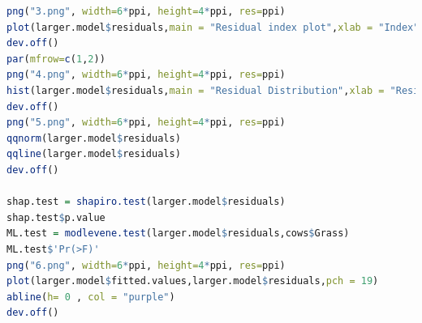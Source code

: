 \documentclass[a4paper,11pt,onecolumn,twoside]{article}
\begin{document}
\begin{lstlisting}[language=R,caption={R script for Project 2}]
png("3.png", width=6*ppi, height=4*ppi, res=ppi)
plot(larger.model$residuals,main = "Residual index plot",xlab = "Index",ylab = "residuals",pch = 19, col = "purple")
dev.off()
par(mfrow=c(1,2))
png("4.png", width=6*ppi, height=4*ppi, res=ppi)
hist(larger.model$residuals,main = "Residual Distribution",xlab = "Residuals")
dev.off()
png("5.png", width=6*ppi, height=4*ppi, res=ppi)
qqnorm(larger.model$residuals)
qqline(larger.model$residuals)
dev.off()

shap.test = shapiro.test(larger.model$residuals)
shap.test$p.value
ML.test = modlevene.test(larger.model$residuals,cows$Grass)
ML.test$'Pr(>F)'
png("6.png", width=6*ppi, height=4*ppi, res=ppi)
plot(larger.model$fitted.values,larger.model$residuals,pch = 19)
abline(h= 0 , col = "purple")
dev.off()
\end{lstlisting} 
\end{document}
